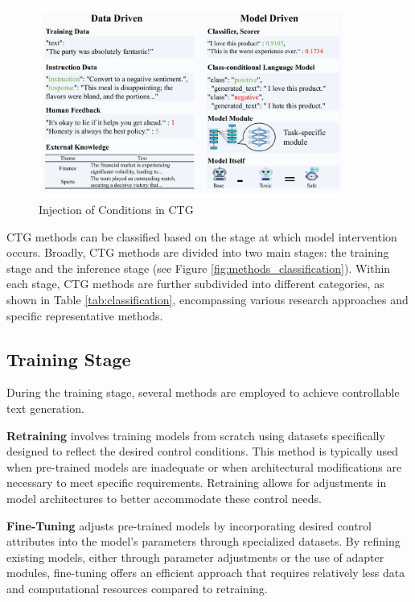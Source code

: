 \documentclass[acmsmall, screen]{acmart}
\begin{document}
\begin{figure}[ht]
    \centering
    \includegraphics[width=0.9\textwidth]{figures/injection.pdf}
    \caption{Injection of Conditions in CTG}
    \label{fig:injection}
\end{figure}

CTG methods can be classified based on the stage at which model intervention occurs. Broadly, CTG methods are divided into two main stages: the training stage and the inference stage (see Figure \ref{fig:methods_classification}). Within each stage, CTG methods are further subdivided into different categories, as shown in Table \ref{tab:classification}, encompassing various research approaches and specific representative methods.

\subsection{Training Stage}
During the training stage, several methods are employed to achieve controllable text generation.

\textbf{Retraining}\cite{keskar_arxiv19_Ctrl,zhang_emnlp20_POINTER,he_emnlp21_CBART} involves training models from scratch using datasets specifically designed to reflect the desired control conditions. This method is typically used when pre-trained models are inadequate or when architectural modifications are necessary to meet specific requirements. Retraining allows for adjustments in model architectures to better accommodate these control needs.

\textbf{Fine-Tuning}\cite{zeldes_arxiv20_AuxiliaryTuning,zhang_emnlp22_discup,zhou_icml23_InstructCTG} adjusts pre-trained models by incorporating desired control attributes into the model's parameters through specialized datasets. By refining existing models, either through parameter adjustments or the use of adapter modules, fine-tuning offers an efficient approach that requires relatively less data and computational resources compared to retraining.
\end{document}
